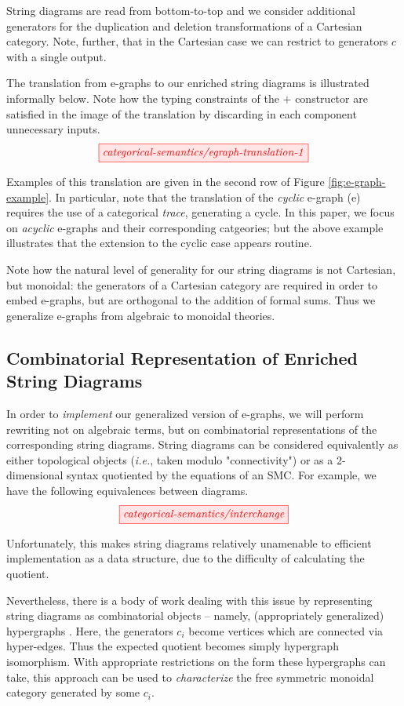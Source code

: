 String diagrams are read from bottom-to-top and we consider additional generators for the duplication and deletion transformations of a Cartesian category.  Note, further, that in the Cartesian case we can restrict to generators $c$ with a single output. 

The translation from e-graphs to our enriched string diagrams is illustrated informally below. 
Note how the typing constraints of the $+$ constructor are satisfied in the image of the translation by discarding in each component unnecessary inputs.
\[
    \tikzfig{categorical-semantics/egraph-translation-1}
\]

Examples of this translation are given in the second row of Figure \ref{fig:e-graph-example}. In particular, note that the translation of the \textit{cyclic} e-graph (e)
requires the use of a categorical \textit{trace}, generating a cycle. In this paper, we focus on \textit{acyclic} e-graphs and their corresponding catgeories; but the above example illustrates that the extension to the cyclic case appears routine.

Note how the natural level of generality for our string diagrams is not Cartesian, but monoidal: the generators of a Cartesian category are required in order to embed e-graphs, but are orthogonal to the addition of formal sums. Thus we generalize e-graphs from algebraic to monoidal theories. 

\subsection*{Combinatorial Representation of Enriched String Diagrams}

In order to \textit{implement} our generalized version of e-graphs, we will  perform rewriting not on algebraic terms, but on combinatorial representations of the corresponding string diagrams.  String diagrams can be considered equivalently as either topological objects (\textit{i.e.}, taken modulo "connectivity") or as a 2-dimensional syntax quotiented by the equations of an SMC. For example, we have the following equivalences between diagrams. 
\[
	\tikzfig{categorical-semantics/interchange}
\]

Unfortunately, this makes string diagrams relatively unamenable to efficient implementation as a data structure, due to the difficulty of calculating the quotient. 

Nevertheless, there is a body of work dealing with this issue by representing string diagrams as combinatorial objects -- namely, (appropriately generalized) hypergraphs 
\cite{bonchi_string_2022-1,bonchi_string_2022-2,bonchi_string_2022}.  Here, the generators $c_i$ become vertices which are connected via hyper-edges.  Thus the expected quotient becomes simply hypergraph isomorphism.  With appropriate restrictions on the form these hypergraphs can take, this approach can be used to \textit{characterize} the free symmetric monoidal category generated by some $c_i$. 

